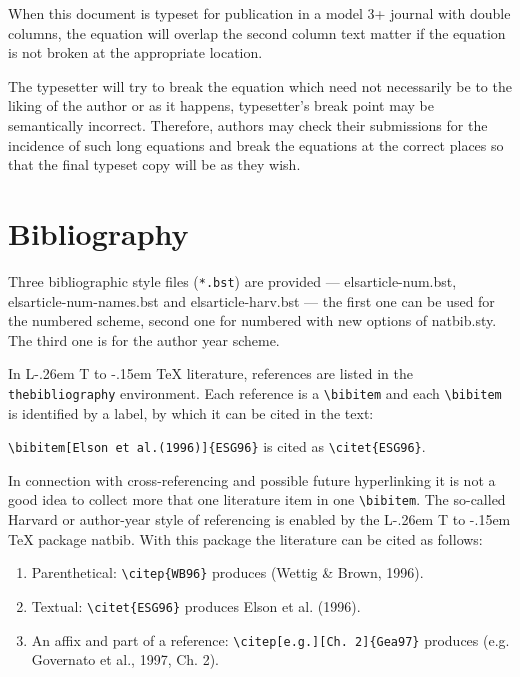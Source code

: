 \documentclass[a4paper,12pt]{article}
\makeatletter
\def\file#1{\textsf{#1}\xspace}
\DeclareRobustCommand{\LaTeX}{L\kern-.26em%
        {\sbox\z@ T%
         \vbox to\ht\z@{\hbox{\check@mathfonts
           \fontsize\sf@size\z@
           \math@fontsfalse\selectfont
          A\,}%
         \vss}%
        }%
     \kern-.15em%
    \TeX}
\makeatother
\begin{document}
\bigskip
\setlength\Sep{6pt}
\def\rulecolor{blue!70}
\def\rulecolor{orange}
                 	
\noindent When this document is typeset for publication in a
model 3+ journal with double columns, the equation will overlap
the second column text matter if the equation is not broken at
the appropriate location.

\vspace*{6pt}
\def\rulecolor{blue!70}
\def\rulecolor{orange}
\vspace*{6pt}

\noindent The typesetter will try to break the equation which
need not necessarily be to the liking of the author or as it
happens, typesetter's break point may be semantically incorrect.
Therefore, authors may check their submissions for the incidence
of such long equations and break the equations at the correct
places so that the final typeset copy will be as they wish.

\section{Bibliography}

Three bibliographic style files (\verb+*.bst+) are provided ---
\file{elsarticle-num.bst}, \file{elsarticle-num-names.bst} and
\file{elsarticle-harv.bst} --- the first one can be used for the
numbered scheme, second one for numbered with new options of 
\file{natbib.sty}. The third one is for the author year
scheme.

In \LaTeX{} literature, references are listed in the
\verb+thebibliography+ environment.  Each reference is a
\verb+\bibitem+ and each \verb+\bibitem+ is identified by a label,
by which it can be cited in the text:

\verb+\bibitem[Elson et al.(1996)]{ESG96}+ is cited as
\verb+\citet{ESG96}+. 

\noindent In connection with cross-referencing and
possible future hyperlinking it is not a good idea to collect
more that one literature item in one \verb+\bibitem+.  The
so-called Harvard or author-year style of referencing is enabled
by the \LaTeX{} package \file{natbib}. With this package the
literature can be cited as follows:

\begin{enumerate}[\textbullet]
\item Parenthetical: \verb+\citep{WB96}+ produces (Wettig \& Brown, 1996).
\item Textual: \verb+\citet{ESG96}+ produces Elson et al. (1996).
\item An affix and part of a reference:
\verb+\citep[e.g.][Ch. 2]{Gea97}+ produces (e.g. Governato et
al., 1997, Ch. 2).
\end{enumerate}
\end{document}
